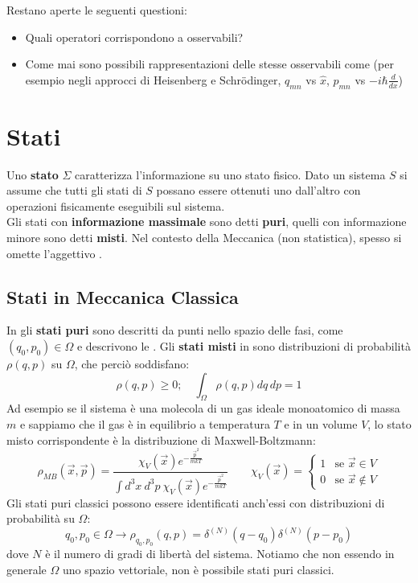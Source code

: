 \documentclass[FisicaTeorica.tex]{subfiles}
\begin{document}
Restano aperte le seguenti questioni:
\begin{itemize}
    \item Quali operatori corrispondono a osservabili?
    \item Come mai sono possibili rappresentazioni delle stesse osservabili come  (per esempio negli approcci di Heisenberg e Schrödinger, $q_{mn}$ vs $\hat{x}$, $p_{mn}$ vs $-i\hbar \frac{d}{dx}$)
\end{itemize}

\section{Stati}
Uno \textbf{stato} $\Sigma$ caratterizza l'informazione  su uno stato fisico. Dato un sistema $S$ si assume che tutti gli stati di $S$ possano essere ottenuti uno dall'altro con operazioni fisicamente eseguibili sul sistema.\\
Gli stati con \textbf{informazione massimale} sono detti \textbf{puri}, quelli con informazione minore sono detti \textbf{misti}. Nel contesto della Meccanica (non statistica), spesso si omette l'aggettivo .

\subsection{Stati in Meccanica Classica}
In \MC gli \textbf{stati puri} sono descritti da punti nello spazio delle fasi, come $(q_0,p_0)\in\Omega$ e descrivono le . 
Gli \textbf{stati misti} in \MC sono distribuzioni di probabilità $\rho(q,p)$ su $\Omega$, che perciò soddisfano:
\[
\rho(q,p)\geq 0; \quad \int_\Omega \rho(q,p) dq\,dp = 1
\]
Ad esempio se il sistema è una molecola di un gas ideale monoatomico di massa $m$ e sappiamo che il gas è in equilibrio a temperatura $T$ e in un volume $V$, lo stato misto corrispondente è la distribuzione di Maxwell-Boltzmann:
\[\rho_{MB}\left(\vec{x},\vec{p}\right)=\frac{\chi_V\left(\vec{x}\right)e^{-\frac{{\vec{p}}^2}{mkT}}}{\int d^3x\ d^3p\ \chi_V\left(\vec{x}\right)e^{-\frac{{\vec{p}}^2}{mkT}}}\quad \quad \chi_V(\vec{x}) = \begin{cases}
1 & \text{se }\vec{x}\in V\\
0 & \text{se }\vec{x}\notin V
\end{cases}
\]
Gli stati puri classici possono essere identificati anch'essi con distribuzioni di probabilità  su $\Omega$:
\[
q_0,p_0\in\Omega\rightarrow\rho_{q_0,p_0}\left(q,p\right)=\delta^{\left(N\right)}\left(q-q_0\right)\delta^{\left(N\right)}\left(p-p_0\right)
\]
dove $N$ è il numero di gradi di libertà del sistema.
Notiamo che non essendo in generale $\Omega$ uno spazio vettoriale, non è possibile  stati puri classici.\\
\end{document}
